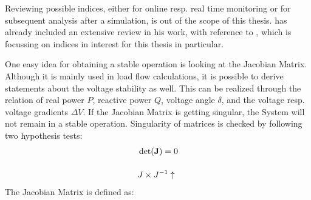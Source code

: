 Reviewing possible indices, either for online resp. real time monitoring or for subsequent analysis after a simulation, is out of the scope of this thesis.
\textcite{danish_2015} has already included an extensive review in his work, with reference to \textcite{doigcardet_2010}, which is focussing on indices in interest for this thesis in particular. 

One easy idea for obtaining a stable operation is looking at the Jacobian Matrix. 
Although it is mainly used in load flow calculations, it is possible to derive statements about the voltage stability as well.
This can be realized through the relation of real power $P$, reactive power $Q$, voltage angle $\delta$, and the voltage resp. voltage gradients $\Delta V$. 
If the Jacobian Matrix is getting singular, the System will not remain in a stable operation.
Singularity of matrices is checked by following two hypothesis tests:
\begin{align}
    &\det(\mathrm{\textbf{J}})=0 \label{eq:jacobian-det} \\[12pt]
    &J \times J^{-1} \uparrow \label{eq:jacobian-rank}
\end{align}
The Jacobian Matrix is defined as:
